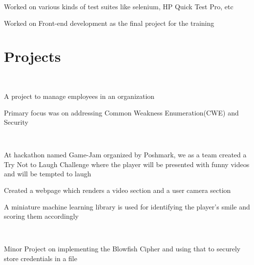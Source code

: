 \documentclass[letterpaper]{deedy-resume} %
\begin{document}
\begin{minipage}[t]{0.66\textwidth}
\begin{tightitemize}
\item Worked on various kinds of test suites like selenium, HP Quick Test Pro, etc
\item Worked on Front-end development as the final project for the training
\end{tightitemize}

\sectionspace %


\section{Projects} 

 \\
\begin{tightitemize}
\item A project to manage employees in an organization 
\item Primary focus was on addressing Common Weakness Enumeration(CWE) and Security
\end{tightitemize}
\sectionspace %

 \\
\begin{tightitemize}
\item At hackathon named Game-Jam organized by Poshmark, we as a team created a Try Not to Laugh Challenge where the player will be presented with funny videos and will be tempted to laugh
\item Created a webpage which renders a video section and a user camera section
\item A miniature machine learning library is used for identifying the player’s smile and scoring them accordingly
\end{tightitemize}
\sectionspace %

 \\
\begin{tightitemize}
\item Minor Project on implementing the Blowfish Cipher and using that to securely store credentials in a file
\end{tightitemize}
\sectionspace %


\end{minipage} %
\end{document}
